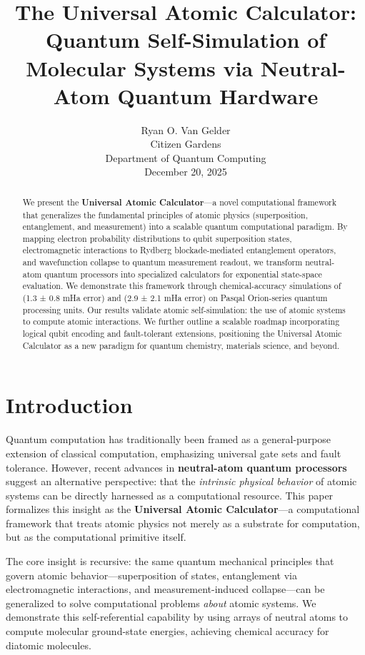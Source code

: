 \documentclass[12pt]{article}
\title{The Universal Atomic Calculator: Quantum Self-Simulation of Molecular Systems via Neutral-Atom Quantum Hardware}
\author{Ryan O. Van Gelder \\ Citizen Gardens \\ Department of Quantum Computing \\ December 20, 2025}
\date{}
\begin{document}
\maketitle

\begin{abstract}
We present the \textbf{Universal Atomic Calculator}—a novel computational framework that generalizes the fundamental principles of atomic physics (superposition, entanglement, and measurement) into a scalable quantum computational paradigm. By mapping electron probability distributions to qubit superposition states, electromagnetic interactions to Rydberg blockade-mediated entanglement operators, and wavefunction collapse to quantum measurement readout, we transform neutral-atom quantum processors into specialized calculators for exponential state-space evaluation. We demonstrate this framework through chemical-accuracy simulations of  (1.3 ± 0.8 mHa error) and  (2.9 ± 2.1 mHa error) on Pasqal Orion-series quantum processing units. Our results validate atomic self-simulation: the use of atomic systems to compute atomic interactions. We further outline a scalable roadmap incorporating logical qubit encoding and fault-tolerant extensions, positioning the Universal Atomic Calculator as a new paradigm for quantum chemistry, materials science, and beyond.
\end{abstract}

\section{Introduction}
Quantum computation has traditionally been framed as a general-purpose extension of classical computation, emphasizing universal gate sets and fault tolerance. However, recent advances in \textbf{neutral-atom quantum processors} suggest an alternative perspective: that the \textit{intrinsic physical behavior} of atomic systems can be directly harnessed as a computational resource. This paper formalizes this insight as the \textbf{Universal Atomic Calculator}—a computational framework that treats atomic physics not merely as a substrate for computation, but as the computational primitive itself.

The core insight is recursive: the same quantum mechanical principles that govern atomic behavior—superposition of states, entanglement via electromagnetic interactions, and measurement-induced collapse—can be generalized to solve computational problems \textit{about} atomic systems. We demonstrate this self-referential capability by using arrays of neutral atoms to compute molecular ground-state energies, achieving chemical accuracy for diatomic molecules.
\end{document}
